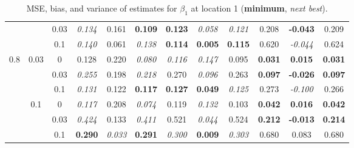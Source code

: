 \documentclass[authoryear, review, 11pt]{elsarticle}
\begin{document}
\begin{table}[ht]
\begin{center}
\begin{tabular}{ccc | ccc | ccc | ccc }
		 &  & 0.03 &   \emph{0.134} & 0.161 & \textbf{0.109} & \textbf{0.123} & \emph{0.058} & \emph{0.121} & 0.208 & \textbf{-0.043} & 0.209 \\ 
		 &  & 0.1 &   \emph{0.140} & 0.061 & \emph{0.138} & \textbf{0.114} & \textbf{0.005} & \textbf{0.115} & 0.620 & \emph{-0.044} & 0.624 \\ \cline{1-12}
		\multirow{6}{*}{0.8} & \multirow{3}{*}{0.03} & 0 &   0.128 & 0.220 & \emph{0.080} & \emph{0.116} & \emph{0.147} & 0.095 & \textbf{0.031} & \textbf{0.015} & \textbf{0.031} \\ 
		 &  & 0.03 &   \emph{0.255} & 0.198 & \emph{0.218} & 0.270 & \emph{0.096} & 0.263 & \textbf{0.097} & \textbf{-0.026} & \textbf{0.097} \\ 
		 &  & 0.1 &   \emph{0.131} & 0.122 & \textbf{0.117} & \textbf{0.127} & \textbf{0.049} & \emph{0.125} & 0.273 & \emph{-0.100} & 0.266 \\ \cline{2-12}
		 & \multirow{3}{*}{0.1} & 0 &   \emph{0.117} & 0.208 & \emph{0.074} & 0.119 & \emph{0.132} & 0.103 & \textbf{0.042} & \textbf{0.016} & \textbf{0.042} \\ 
		 &  & 0.03 &   \emph{0.424} & 0.133 & \emph{0.411} & 0.521 & \emph{0.044} & 0.524 & \textbf{0.212} & \textbf{-0.013} & \textbf{0.214} \\ 
		 &  & 0.1 &   \textbf{0.290} & \emph{0.033} & \textbf{0.291} & \emph{0.300} & \textbf{0.009} & \emph{0.303} & 0.680 & 0.083 & 0.680 \\ 
		  \end{tabular}
		\caption{MSE, bias, and variance of estimates for $\beta_1$ at location 1 (\textbf{minimum}, \emph{next best}).\label{table:loc1-estimation}}
		\end{center}
		\end{table}
		
\end{document}
